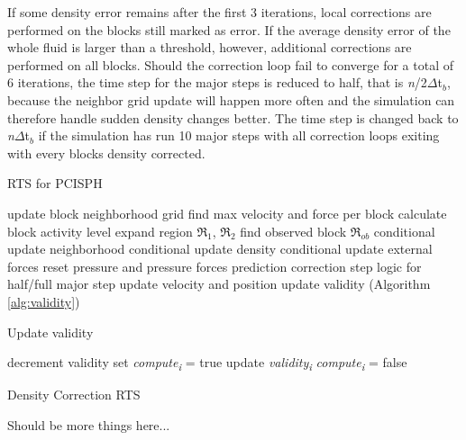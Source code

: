 \documentclass[../../main.tex]{subfiles}
\begin{document}
If some density error remains after the first 3 iterations, local corrections are performed on the blocks still marked as error. If the average density error of the whole fluid is larger than a threshold, however, additional corrections are performed on all blocks. Should the correction loop fail to converge for a total of 6 iterations, the time step for the major steps is reduced to half, that is \textit{n}/2$\Delta$t$_b$, because the neighbor grid update will happen more often and the simulation can therefore handle sudden density changes better. The time step is changed back to \textit{n}$\Delta$t$_b$ if the simulation has run 10 major steps with all correction loops exiting with every blocks density corrected. 


\begin{algorithm}[]
    \caption{RTS for PCISPH}
    \label{alg:rts:pcisph}
    \begin{algorithmic}[1]
            \State update block neighborhood grid
            \State find max velocity and force per block
            \State calculate block activity level
            \State expand region $\Re_1$, $\Re_2$
            \State find observed block $\Re_{ob}$
                \State conditional update neighborhood
                \State conditional update density 
                \State conditional update external forces 
                \State reset pressure and pressure forces
                \State prediction correction step
                \State logic for half/full major step
                \State update velocity and position
                \State update validity (Algorithm \ref{alg:validity})
            \EndFor
        \EndWhile
   \end{algorithmic}
\end{algorithm}

 
\begin{algorithm}[h]
    \caption{Update validity}
    \label{alg:validity}
    \begin{algorithmic}[1]
            \State decrement validity
                \State set \textit{{\texorpdfstring{compute\textsubscript{i}}{compute i}}} = true
                \State update \textit{{\texorpdfstring{validity\textsubscript{i}}{validity i}}}
            \Else
                \State \textit{{\texorpdfstring{compute\textsubscript{i}}{compute i}}} = false
            \EndIf
        \EndFor
   \end{algorithmic}
\end{algorithm}


\begin{algorithm}[h]
    \caption{Density Correction RTS}
    \label{alg:rts:correction}
    \begin{algorithmic}[1]
       \State Should be more things here...
   \end{algorithmic}
\end{algorithm}
\end{document}

